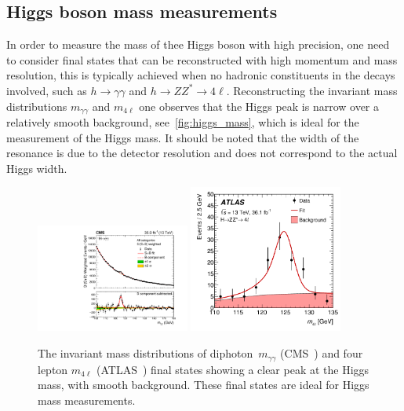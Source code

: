 \subsection{Higgs boson mass measurements}
In order to measure the mass of thee Higgs boson with high precision, one need to consider final states that can be reconstructed with high momentum and mass resolution, this is typically achieved when no hadronic constituents in the decays involved, such as  $ h \to \gamma \gamma$ and $ h \to Z Z^*\to 4 \ell$. Reconstructing the invariant mass distributions $m_{\gamma \gamma}$ and $m_{4\ell}$ one observes that the Higgs peak is narrow over a relatively smooth background, see~\autoref{fig:higgs_mass}, which is ideal for the measurement of the Higgs mass. It should be noted that the width of the resonance is due to the detector resolution and does not correspond to the actual Higgs width.\\
\begin{figure}[t!]
	\begin{center}
		\includegraphics[width=0.45\textwidth]{figures/Higgs_results/CMS-HIG-19-004_Figure_005-b}
		\includegraphics[width=0.45\textwidth]{figures/Higgs_results/dataAll_H4l_m4l_pdf_constrained} 
		\caption{The invariant mass distributions of diphoton~$m_{\gamma \gamma}$ (CMS~\cite{CMS:2020xrn}) and four lepton $m_{4 \ell}$ (ATLAS~\cite{ATLAS:2018tdk}) final states showing a clear peak at the Higgs mass, with smooth background. These final states are ideal for Higgs mass measurements. \label{fig:higgs_mass} }
	\end{center}
\end{figure}
